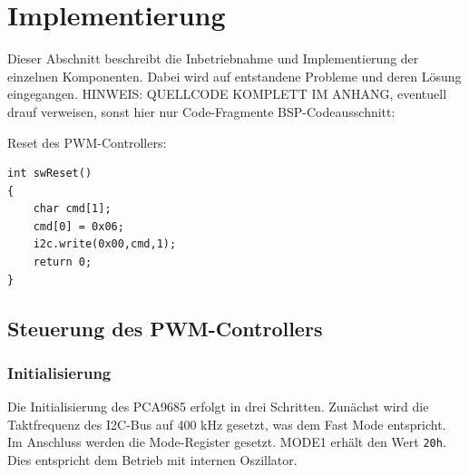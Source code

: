 \documentclass[a4paper,12pt]{scrartcl}
\begin{document}
\clearpage
\section{Implementierung}
Dieser Abschnitt beschreibt die Inbetriebnahme und Implementierung der einzelnen Komponenten. Dabei wird auf entstandene Probleme und deren Lösung eingegangen.
HINWEIS: QUELLCODE KOMPLETT IM ANHANG, eventuell drauf verweisen, sonst hier nur Code-Fragmente
BSP-Codeausschnitt:

Reset des PWM-Controllers:
\begin{lstlisting}[captionpos=b, caption=Code-Ausschnitt: Software-Reset des PWM-Controllers, label=codeswreset]
int swReset()
{
    char cmd[1];
    cmd[0] = 0x06;
    i2c.write(0x00,cmd,1);
    return 0;
}
\end{lstlisting}


\subsection{Steuerung des PWM-Controllers}

\subsubsection{Initialisierung}
Die Initialisierung des PCA9685 erfolgt in drei Schritten. Zunächst wird die Taktfrequenz des I2C-Bus auf 400 kHz gesetzt, was dem Fast Mode entspricht. Im
Anschluss werden die Mode-Register gesetzt. MODE1 erhält den Wert \texttt{20h}.
Dies entspricht dem Betrieb mit internen Oszillator.
\end{document}
